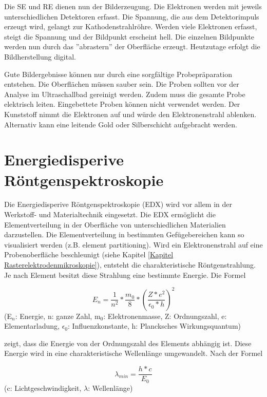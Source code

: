 \documentclass[a4paper, 11pt]{tubsreprt}
\begin{document}
Die SE und RE dienen nun der Bilderzeugung. Die Elektronen werden mit jeweils unterschiedlichen Detektoren erfasst. Die Spannung, die aus dem Detektorimpuls erzeugt wird, gelangt zur Kathodenstrahlröhre. Werden viele Elektronen erfasst, steigt die Spannung und der Bildpunkt erscheint hell. Die einzelnen Bildpunkte werden nun durch das ''abrastern'' der Oberfläche erzeugt. Heutzutage erfolgt die Bildherstellung digital\cite[vgl.]{Welsch2015}.

Gute Bildergebnisse können nur durch eine sorgfältige Probepräparation entstehen. Die Oberflächen müssen sauber sein. Die Proben sollten vor der Analyse im Ultraschallbad gereinigt werden.  Zudem muss die gesamte Probe elektrisch leiten. Eingebettete Proben können nicht verwendet werden. Der Kunststoff nimmt die Elektronen auf und würde den Elektronenstrahl ablenken. Alternativ kann eine leitende Gold oder Silberschicht aufgebracht werden.   

\section{Energiedisperive Röntgenspektroskopie}

Die Energiedisperive Röntgenspektroskopie (EDX) wird vor allem in der Werkstoff- und Materialtechnik eingesetzt. Die EDX ermöglicht die Elementverteilung in der Oberfläche von unterschiedlichen Materialien  darzustellen. Die Elementverteilung in bestimmten Gefügebereichen kann so visualisiert werden (z.B. element partitioning).
Wird ein Elektronenstrahl auf eine Probenoberfläche beschleunigt (siehe Kapitel \ref{Kapitel Rasterelektrodenmikroskopie}), entsteht die charakteristische Röntgenstrahlung. Je nach Element besitzt diese Strahlung eine bestimmte Energie. Die Formel

\begin{equation}
E_{ n }=\frac{ 1 }{ n^{ 2 } }*\frac{ m_{ 0 } }{ 8 }*\left( \frac{ Z*e^{ 2 } }{ \epsilon_{ 0 }*h } \right)^{ 2 }
\end{equation}
(E$_{n}$: Energie, n: ganze Zahl, m$_{0}$: Elektronenmasse, Z: Ordnungszahl, e: Elementarladung, $\epsilon_{0}$: Influenzkonstante, h: Plancksches Wirkungsquantum)  

zeigt, dass die Energie von der Ordnungszahl des Elements abhängig ist. Diese Energie wird in eine charakteristische Wellenlänge umgewandelt. Nach der Formel  

\begin{equation}
\lambda_{ min }=\frac{ h*c }{ E_{ 0 } }
\end{equation}
(c: Lichtgeschwindigkeit, $\lambda$: Wellenlänge)
\end{document}
